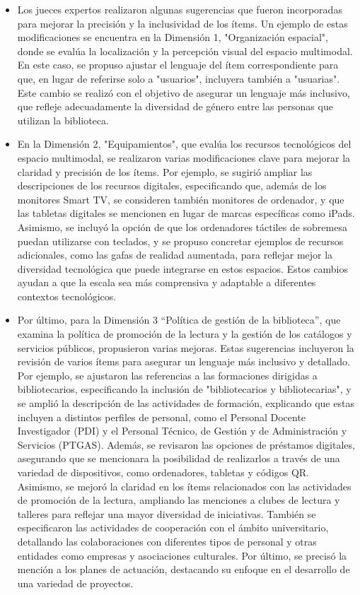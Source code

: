\documentclass[spanish]{textolivre}
\begin{document}
\begin{itemize}
    \item Los jueces expertos realizaron algunas sugerencias que fueron incorporadas para mejorar la precisión y la inclusividad de los ítems. Un ejemplo de estas modificaciones se encuentra en la Dimensión 1, "Organización espacial", donde se evalúa la localización y la percepción visual del espacio multimodal. En este caso, se propuso ajustar el lenguaje del ítem correspondiente para que, en lugar de referirse solo a "usuarios", incluyera también a "usuarias". Este cambio se realizó con el objetivo de asegurar un lenguaje más inclusivo, que refleje adecuadamente la diversidad de género entre las personas que utilizan la biblioteca.
    \item En la Dimensión 2, "Equipamientos", que evalúa los recursos tecnológicos del espacio multimodal, se realizaron varias modificaciones clave para mejorar la claridad y precisión de los ítems. Por ejemplo, se sugirió ampliar las descripciones de los recursos digitales, especificando que, además de los monitores Smart TV, se consideren también monitores de ordenador, y que las tabletas digitales se mencionen en lugar de marcas específicas como iPads. Asimismo, se incluyó la opción de que los ordenadores táctiles de sobremesa puedan utilizarse con teclados, y se propuso concretar ejemplos de recursos adicionales, como las gafas de realidad aumentada, para reflejar mejor la diversidad tecnológica que puede integrarse en estos espacios. Estos cambios ayudan a que la escala sea más comprensiva y adaptable a diferentes contextos tecnológicos.
    \item Por último, para la Dimensión 3 “Política de gestión de la biblioteca”, que examina la política de promoción de la lectura y la gestión de los catálogos y servicios públicos, propusieron varias mejoras. Estas sugerencias incluyeron la revisión de varios ítems para asegurar un lenguaje más inclusivo y detallado. Por ejemplo, se ajustaron las referencias a las formaciones dirigidas a bibliotecarios, especificando la inclusión de "bibliotecarios y bibliotecarias", y se amplió la descripción de las actividades de formación, explicando que estas incluyen a distintos perfiles de personal, como el Personal Docente Investigador (PDI) y el Personal Técnico, de Gestión y de Administración y Servicios (PTGAS). Además, se revisaron las opciones de préstamos digitales, asegurando que se mencionara la posibilidad de realizarlos a través de una variedad de dispositivos, como ordenadores, tabletas y códigos QR. Asimismo, se mejoró la claridad en los ítems relacionados con las actividades de promoción de la lectura, ampliando las menciones a clubes de lectura y talleres para reflejar una mayor diversidad de iniciativas. También se especificaron las actividades de cooperación con el ámbito universitario, detallando las colaboraciones con diferentes tipos de personal y otras entidades como empresas y asociaciones culturales. Por último, se precisó la mención a los planes de actuación, destacando su enfoque en el desarrollo de una variedad de proyectos.
\end{itemize}
\end{document}
